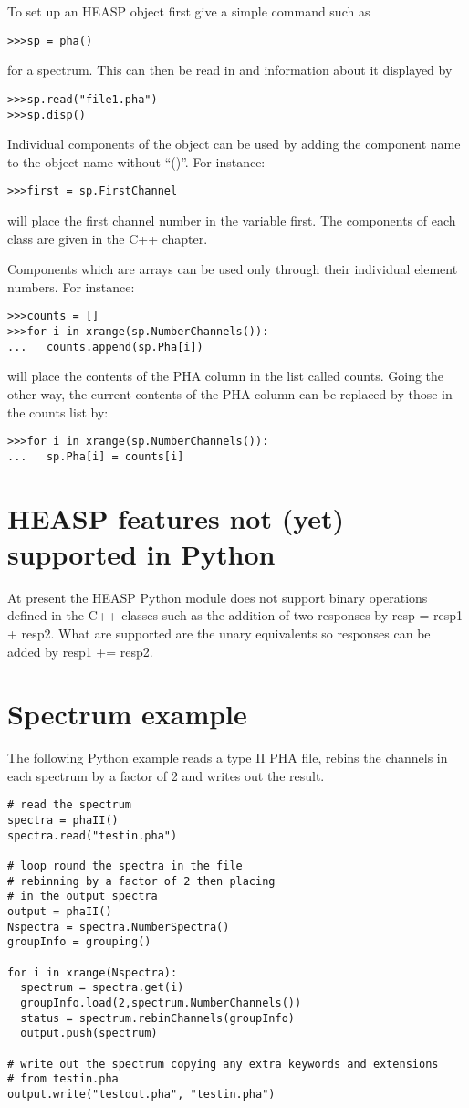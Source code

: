 \documentclass[11pt]{book}
\begin{document}
To set up an HEASP object first give a simple command such as
\begin{verbatim}
>>>sp = pha()
\end{verbatim}
for a spectrum. This can then be read in and information about it
displayed by
\begin{verbatim}
>>>sp.read("file1.pha")
>>>sp.disp()
\end{verbatim}
Individual components of the object can be used by adding the
component name to the object name without ``()''. For instance:
\begin{verbatim}
>>>first = sp.FirstChannel
\end{verbatim}
will place the first channel number in the variable first. The
components of each class are given in the C++ chapter.

Components which are arrays can be used only through their individual
element numbers. For instance:
\begin{verbatim}
>>>counts = []
>>>for i in xrange(sp.NumberChannels()):
...   counts.append(sp.Pha[i])
\end{verbatim}
will place the contents of the PHA column in the list called
counts. Going the other way, the current contents of the PHA column
can be replaced by those in the counts list by:
\begin{verbatim}
>>>for i in xrange(sp.NumberChannels()):
...   sp.Pha[i] = counts[i]
\end{verbatim}

\section{HEASP features not (yet) supported in Python}

At present the HEASP Python module does not support binary
operations defined in the C++ classes such as the addition of two
responses by resp = resp1 + resp2. What are supported are the unary
equivalents so responses can be added by resp1 += resp2.

\section{Spectrum example}

The following Python example reads a type II PHA file, rebins the
channels in each spectrum by a factor of 2 and writes out the result.
\begin{verbatim}
# read the spectrum
spectra = phaII()
spectra.read("testin.pha")

# loop round the spectra in the file
# rebinning by a factor of 2 then placing
# in the output spectra
output = phaII()
Nspectra = spectra.NumberSpectra()
groupInfo = grouping()

for i in xrange(Nspectra):
  spectrum = spectra.get(i)
  groupInfo.load(2,spectrum.NumberChannels())
  status = spectrum.rebinChannels(groupInfo)
  output.push(spectrum)

# write out the spectrum copying any extra keywords and extensions
# from testin.pha
output.write("testout.pha", "testin.pha")
\end{verbatim}
\end{document}
